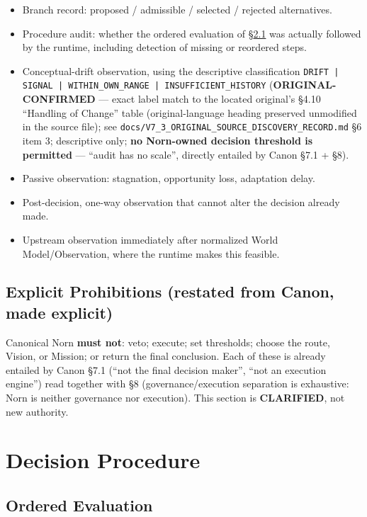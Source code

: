 \begin{itemize}
\item Branch record: proposed / admissible / selected / rejected
alternatives.
\item Procedure audit: whether the ordered evaluation of
\S\ref{sec:v73-decision-procedure} was actually followed by the
runtime, including detection of missing or reordered steps.
\item Conceptual-drift observation, using the descriptive
classification \texttt{DRIFT | SIGNAL | WITHIN\_OWN\_RANGE |
INSUFFICIENT\_HISTORY} (\textbf{ORIGINAL-CONFIRMED} --- exact label
match to the located original's \S4.10 ``Handling of Change'' table
(original-language heading preserved unmodified in the source file);
see
\texttt{docs/V7\_3\_ORIGINAL\_SOURCE\_DISCOVERY\_RECORD.md} \S6 item 3;
descriptive only; \textbf{no Norn-owned decision threshold is
permitted} --- ``audit has no scale'', directly entailed by Canon
\S7.1 + \S8).
\item Passive observation: stagnation, opportunity loss, adaptation
delay.
\item Post-decision, one-way observation that cannot alter the
decision already made.
\item Upstream observation immediately after normalized World
Model/Observation, where the runtime makes this feasible.
\end{itemize}

\section{Explicit Prohibitions (restated from Canon, made explicit)}
\label{sec:v73-norn-prohibitions}

Canonical Norn \textbf{must not}: veto; execute; set thresholds;
choose the route, Vision, or Mission; or return the final conclusion.
Each of these is already entailed by Canon \S7.1 (``not the final
decision maker'', ``not an execution engine'') read together with
\S8 (governance/execution separation is exhaustive: Norn is neither
governance nor execution). This section is \textbf{CLARIFIED}, not new
authority.

\chapter{Decision Procedure}
\label{ch:v73-decision-procedure}

\section{Ordered Evaluation}
\label{sec:v73-decision-procedure}

